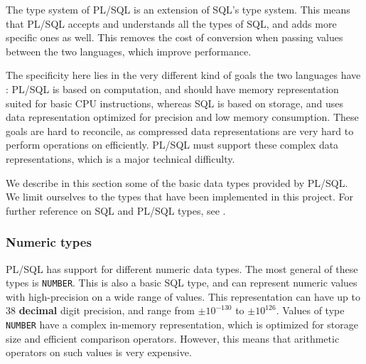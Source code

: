 \documentclass[twoside,11pt,a4paper]{article}
\newcommand{\pls}[1]{\small\texttt{#1}\normalsize}
\newcommand{\plstype}[1]{\pls{#1}}
\newcommand{\oranum}{\plstype{NUMBER}}
\begin{document}
The type system of PL/SQL is an extension of SQL's type system. This means that PL/SQL accepts and understands all the types of SQL, and adds more specific ones as well. This removes the cost of conversion when passing values between the two languages, which improve performance.


The specificity here lies in the very different kind of goals the two languages have : PL/SQL is based on computation, and should have memory representation suited for basic CPU instructions, whereas SQL is based on storage, and uses data representation optimized for precision and low memory consumption. These goals are hard to reconcile, as compressed data representations are very hard to perform operations on efficiently. PL/SQL must support these complex data representations, which is a major technical difficulty.


We describe in this section some of the basic data types provided by PL/SQL. We limit ourselves to the types that have been implemented in this project. For further reference on SQL and PL/SQL types, see \cite{plsdoc, sqldoc}.

\subsubsection{Numeric types}

\label{sec:numerictypes}

PL/SQL has support for different numeric data types. The most general of these types is \oranum{}. This is also a basic SQL type, and can represent numeric values with high-precision on a wide range of values. This representation can have up to 38 \textbf{decimal} digit precision, and range from $ \pm 10^{-130}$ to $\pm 10^{126}$. Values of type \oranum{} have a complex in-memory representation, which is optimized for storage size and efficient comparison operators. However, this means that arithmetic operators on such values is very expensive.
\end{document}
